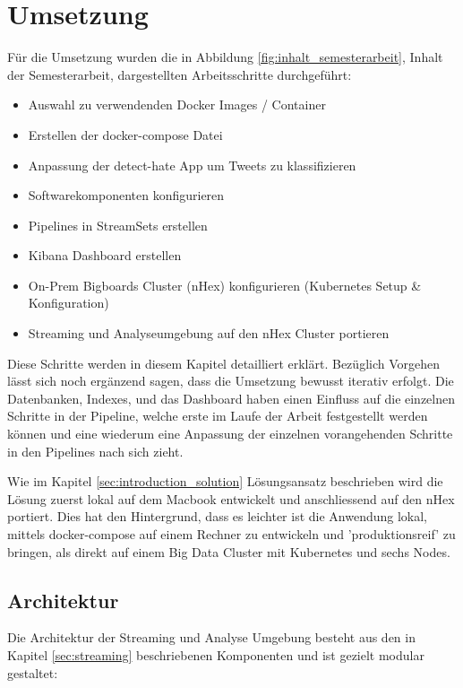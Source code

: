 \chapter{Umsetzung}
\label{chap:data_collection}
F{\"u}r die Umsetzung wurden die in Abbildung \ref{fig:inhalt_semesterarbeit}, Inhalt der Semesterarbeit, dargestellten Arbeitsschritte durchgef{\"u}hrt:

\begin{itemize}
  \item Auswahl zu verwendenden Docker Images / Container  
  \item Erstellen der docker-compose Datei
  \item Anpassung der detect-hate App um Tweets zu klassifizieren 
  \item Softwarekomponenten konfigurieren
  \item Pipelines in StreamSets erstellen
  \item Kibana Dashboard erstellen
  \item On-Prem Bigboards Cluster (nHex) konfigurieren (Kubernetes Setup \& Konfiguration)
  \item Streaming und Analyseumgebung auf den nHex Cluster portieren
\end{itemize}

Diese Schritte werden in diesem Kapitel detailliert erkl{\"a}rt. Bez{\"u}glich  Vorgehen l{\"a}sst sich noch erg{\"a}nzend sagen, dass die Umsetzung bewusst iterativ erfolgt. Die Datenbanken, Indexes, und das Dashboard haben einen Einfluss auf die einzelnen Schritte in der Pipeline, welche erste im Laufe der Arbeit festgestellt werden k{\"o}nnen und eine wiederum eine Anpassung der einzelnen vorangehenden Schritte in den Pipelines nach sich zieht.

Wie im Kapitel \ref{sec:introduction_solution} L{\"o}sungsansatz beschrieben wird die L{\"o}sung zuerst lokal auf dem Macbook  entwickelt und  anschliessend auf den nHex portiert. Dies hat den Hintergrund, dass es leichter ist die Anwendung lokal, mittels docker-compose auf einem Rechner zu entwickeln und 'produktionsreif' zu bringen, als direkt auf einem Big Data Cluster mit Kubernetes und sechs Nodes. 

\section{Architektur}
\label{sec:rchitecture}
Die Architektur der Streaming und Analyse Umgebung besteht aus den in Kapitel \ref{sec:streaming} beschriebenen Komponenten und ist gezielt modular gestaltet: 

